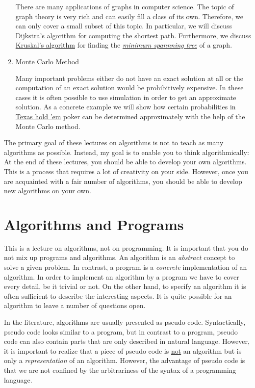 \begin{enumerate}
      There are many applications of graphs in computer science.  The topic of graph theory is very
      rich and can easily fill a class of its own.  Therefore, we can only cover a small subset of this topic.
      In particular, we will discuss
      \href{http://en.wikipedia.org/wiki/Dijkstra%27s_algorithm}{Dijkstra's algorithm}
      for computing the shortest path.
      Furthermore, we discuss 
      \href{https://en.wikipedia.org/wiki/Kruskal%27s_algorithm}{Kruskal's algorithm} for finding the
      \href{https://en.wikipedia.org/wiki/Minimum_spanning_tree}{\emph{minimum spannning tree}} of a graph.
\item \href{http://en.wikipedia.org/wiki/Monte_Carlo_method}{Monte Carlo Method} 
 
      Many important problems either do not have an exact solution at all or the computation of an
      exact solution would be prohibitively expensive.  In these cases it is often possible to use 
      simulation in order to get an approximate solution.  As a concrete example we will show
      how certain probabilities in \href{http://en.wikipedia.org/wiki/Texas_hold_%27em}{Texas hold 'em} 
      poker can be determined approximately with the help of the Monte
      Carlo method.
\end{enumerate}
The primary goal of these lectures on algorithms is not to teach as many algorithms as possible.
Instead, my goal is to enable you to think algorithmically:  At the end of these
lectures, you should be able to develop your own algorithms.  This is a process that
requires a lot of creativity on your side.
However, once you are acquainted with a fair number of algorithms, you should be able to develop
new algorithms on your own.

\section{Algorithms and Programs}
This is a lecture on algorithms, not on programming.  It is important that you do not mix up
programs and algorithms.  An algorithm is an \emph{abstract} concept to solve a given problem.  In
contrast, a program is a \emph{concrete} implementation of an algorithm.  In order to implement an
algorithm by a program we have to cover every detail, be it trivial or not.  On the other hand, 
to specify an algorithm it is often sufficient to describe the interesting aspects.  It is
quite possible for an algorithm to leave a number of questions open.

In the literature, algorithms are usually presented as pseudo code.  Syntactically, pseudo code looks
similar to a program, but in contrast to a program, pseudo code can also contain parts that are only
described in natural language.   However, it is important to realize that a piece of pseudo code is
\underline{not} an algorithm but is only a \emph{ representation} of an algorithm.  However, the
advantage of pseudo code is that we are not confined by the arbitrariness of the syntax of a
programming language.

